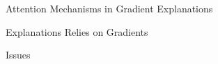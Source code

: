 \begin{frame}[standout]
	Attention Mechanisms in Gradient Explanations
\end{frame}

\begin{frame}{Explanations Relies on Gradients}
\end{frame} 





\begin{frame}{Issues}
\end{frame}
